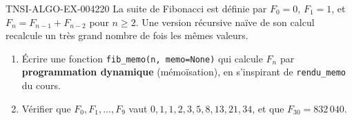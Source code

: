 \begin{exercice}{TNSI-ALGO-EX-004}{2}{20}
La suite de Fibonacci est définie par $F_0 = 0$, $F_1 = 1$, et $F_n = F_{n-1} + F_{n-2}$ pour $n \geq 2$. Une version récursive naïve de son calcul recalcule un très grand nombre de fois les mêmes valeurs.
\begin{enumerate}
  \item Écrire une fonction \lstinline{fib_memo(n, memo=None)} qui calcule $F_n$ par \textbf{programmation dynamique} (mémoïsation), en s'inspirant de \lstinline{rendu_memo} du cours.
  \item Vérifier que $F_0, F_1, \dots, F_9$ vaut $0, 1, 1, 2, 3, 5, 8, 13, 21, 34$, et que $F_{30} = 832\,040$.
\end{enumerate}
\end{exercice}

